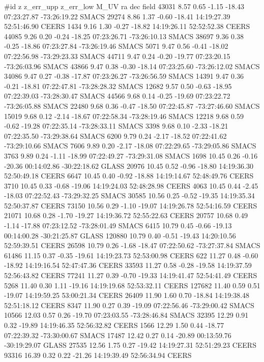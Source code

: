 #id z z_err_upp z_err_low M_UV ra dec field
43031 8.57 0.65 -1.15 -18.43  07:23:27.87  -73:26:19.22 SMACS
29274 8.86 1.37 -0.60 -18.41  14:19:27.39 52:51:46.90 CEERS
1434 9.16 1.30 -0.27 -18.82  14:19:26.11 52:52:52.38 CEERS
44085 9.26 0.20 -0.24 -18.25  07:23:26.71  -73:26:10.13 SMACS
38697 9.36 0.38 -0.25 -18.86  07:23:27.84  -73:26:19.46 SMACS
5071 9.47 0.56 -0.41 -18.02  07:22:56.98  -73:29:23.33 SMACS
44711 9.47 0.24 -0.20 -19.77  07:23:20.15  -73:26:03.96 SMACS
43866 9.47 0.38 -0.30 -18.14  07:23:25.60  -73:26:12.02 SMACS
34086 9.47 0.27 -0.38 -17.87  07:23:26.27  -73:26:56.59 SMACS
14391 9.47 0.36 -0.21 -18.81  07:22:47.81  -73:28:28.32 SMACS
12682 9.57 0.50 -0.63 -18.95  07:22:39.03  -73:28:30.47 SMACS
44566 9.68 0.14 -0.25 -19.69  07:23:22.72  -73:26:05.88 SMACS
22480 9.68 0.36 -0.47 -18.50  07:22:45.87  -73:27:46.60 SMACS
15019 9.68 0.12 -2.14 -18.67  07:22:58.34  -73:28:19.46 SMACS
12218 9.68 0.59 -0.62 -19.28  07:22:35.14  -73:28:33.11 SMACS
3398 9.68 0.10 -2.33 -18.21  07:22:35.50  -73:29:38.64 SMACS
6200 9.79 0.24 -2.17 -18.52  07:22:41.62  -73:29:10.66 SMACS
7606 9.89 0.20 -2.17 -18.08  07:22:29.65  -73:29:05.86 SMACS
3763 9.89 0.24 -1.11 -18.99  07:22:49.27  -73:29:31.08 SMACS
1698 10.45 0.26 -0.16 -20.36  00:14:02.86  -30:22:18.62 GLASS
20976 10.45 0.52 -0.96 -18.80  14:19:36.30 52:50:49.18 CEERS
6647 10.45 0.40 -0.92 -18.88  14:19:14.67 52:48:49.76 CEERS
3710 10.45 0.33 -0.68 -19.06  14:19:24.03 52:48:28.98 CEERS
4063 10.45 0.44 -2.45 -18.03  07:22:52.43  -73:29:32.25 SMACS
30585 10.56 0.25 -0.52 -19.35  14:19:35.34 52:50:37.87 CEERS
73150 10.56 0.29 -1.10 -19.07  14:19:26.78 52:54:16.59 CEERS
21071 10.68 0.28 -1.70 -19.27  14:19:36.72 52:55:22.63 CEERS
20757 10.68 0.49 -1.14 -17.88  07:23:12.52  -73:28:01.49 SMACS
6415 10.79 0.45 -0.66 -19.13  00:14:00.28  -30:21:25.87 GLASS
120880 10.79 0.40 -0.51 -19.43  14:20:10.56 52:59:39.51 CEERS
26598 10.79 0.26 -1.68 -18.47  07:22:50.62  -73:27:37.84 SMACS
61486 11.15 0.37 -0.35 -19.61  14:19:23.73 52:53:00.98 CEERS
622 11.27 0.48 -0.60 -18.92  14:19:16.54 52:47:47.36 CEERS
33593 11.27 0.58 -0.28 -19.58  14:19:37.59 52:56:43.82 CEERS
77241 11.27 0.39 -0.70 -19.33  14:19:41.47 52:54:41.49 CEERS
5268 11.40 0.30 1.11 -19.16 14:19:19.68 52:53:32.11 CEERS
127682 11.40 0.59 0.51 -19.07 14:19:59.25 53:00:21.34 CEERS
26409 11.90 1.60 0.70 -18.84 14:19:38.48 52:51:18.12 CEERS
8347 11.90 0.27 0.39 -19.09 07:22:56.46 -73:29:00.42 SMACS
10566 12.03 0.57 0.26 -19.70 07:23:03.55 -73:28:46.84 SMACS
32395 12.29 0.91 0.32 -19.89 14:19:46.35 52:56:32.82 CEERS
1566 12.29 1.50 0.44 -18.77 07:22:39.32 -73:30:00.67 SMACS
17487 12.42 0.27 0.14 -20.89 00:13:59.76 -30:19:29.07 GLASS
27535 12.56 1.75 0.27 -19.42 14:19:27.31 52:51:29.23 CEERS
93316 16.39 0.32 0.22 -21.26 14:19:39.49 52:56:34.94 CEERS
